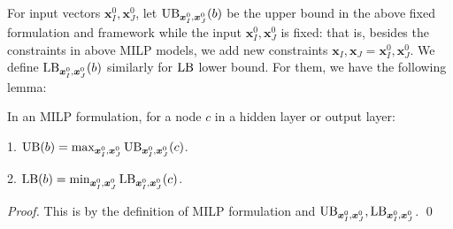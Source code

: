 			
			
\iffalse			
			For input vectors $\boldsymbol{x}^0_I,\boldsymbol{x}^0_J$, let $\mathrm{UB}_{\boldsymbol{x}^0_I,\boldsymbol{x}^0_J}(b)$ be the upper bound in the above fixed formulation and framework while the input $\boldsymbol{x}^0_I,\boldsymbol{x}^0_J$ is fixed: that is, besides the constraints in above MILP models, we add new constraints $\boldsymbol{x}_I,\boldsymbol{x}_J=\boldsymbol{x}^0_I,\boldsymbol{x}^0_J$. We  define $\mathrm{LB}_{\boldsymbol{x}^0_I,\boldsymbol{x}^0_J}(b)$ similarly for $\mathrm{LB}$ lower bound. For them, we have the following lemma:
			
			\begin{lemma} In an MILP formulation, for a node $c$ in a hidden layer or output layer:
				
				1. $\mathrm{UB}(b)=\max_{\boldsymbol{x}^0_I,\boldsymbol{x}^0_J}\mathrm{UB}_{\boldsymbol{x}^0_I,\boldsymbol{x}^0_J}(c)$. 
				
				2. $\mathrm{LB}(b)=\min_{\boldsymbol{x}^0_I,\boldsymbol{x}^0_J}\mathrm{LB}_{\boldsymbol{x}^0_I,\boldsymbol{x}^0_J}(c)$. 
			\end{lemma}
			
			\begin{proof}
				This is by the definition of MILP formulation and $\mathrm{UB}_{\boldsymbol{x}^0_I,\boldsymbol{x}^0_J}, \mathrm{LB}_{\boldsymbol{x}^0_I,\boldsymbol{x}^0_J}$. \qed
			\end{proof}
			
	
			
			
			
	

